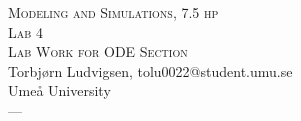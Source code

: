 \documentclass[12pt,a4paper]{article}
\renewcommand{\dateseparator}{--}
\newcommand{\todayiso}{\the\year \dateseparator \twodigit\month \dateseparator \twodigit\day}
\begin{document}
\begin{titlepage}
    \begin{center}
        \LARGE{\textsc{Modeling and Simulations, 7.5 hp}}\\ 
          \large{\textsc{Lab 4}}\\
          \large{\textsc{Lab Work for ODE Section}}\\[1cm]
%            
        Torbjørn Ludvigsen, tolu0022@student.umu.se\\
        \vfill
        \small{%
          Umeå University \\
      \todayiso}
    \end{center}
\end{titlepage}
\end{document}
